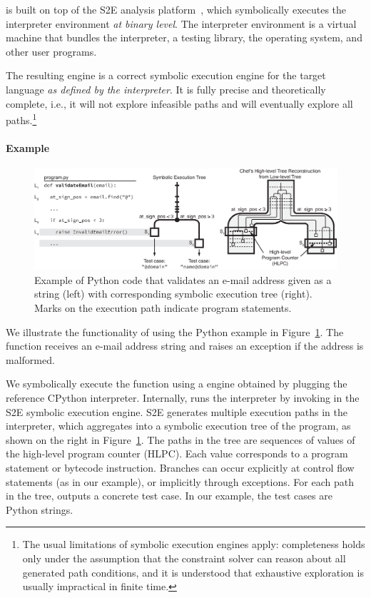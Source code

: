 \chef is built on top of the S2E analysis platform~\cite{s2eSystem}, which symbolically executes the interpreter environment \emph{at binary level}.
%
The interpreter environment is a virtual machine that bundles the interpreter, a testing library, the operating system, and other user programs.

The resulting engine is a correct symbolic execution engine for the target language \emph{as defined by the interpreter}.
%
It is fully precise and theoretically complete, i.e., it will not explore infeasible paths and will eventually explore all paths.\footnote{The usual limitations of symbolic execution engines apply: completeness holds only under the assumption that the constraint solver can reason about all generated path conditions, and it is understood that exhaustive exploration is usually impractical in finite time.}

\paragraph{Example}

\begin{figure}
  \centering
  \includegraphics[width=\textwidth]{figures/chef/running-example}
  \caption{Example of Python code that validates an e-mail address given as a string (left) with corresponding symbolic execution tree (right).  Marks on the execution path indicate program statements.}
  \label{fig:chef:running-example}
\end{figure}

We illustrate the functionality of \chef using the Python example in Figure~\ref{fig:chef:running-example}.
%
The function  receives an e-mail address string and raises an exception if the address is malformed.

We symbolically execute the function using a \chef engine obtained by plugging the reference CPython interpreter.
%
Internally, \chef runs the interpreter by invoking  in the S2E symbolic execution engine.
%
S2E generates multiple execution paths in the interpreter, which \chef aggregates into a symbolic execution tree of the program, as shown on the right in Figure~\ref{fig:chef:running-example}.
%
The paths in the tree are sequences of values of the high-level program counter (HLPC).  Each \hlpc value corresponds to a program statement or bytecode instruction.  Branches can occur explicitly at control flow statements (as in our example), or implicitly through exceptions.
%
For each path in the tree, \chef outputs a concrete test case.  In our example, the test cases are Python strings.

